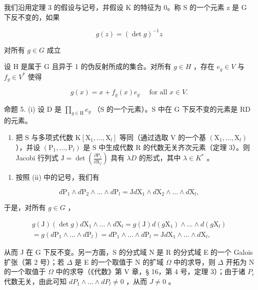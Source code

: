 我们沿用定理 3 的假设与记号，并假设 K 的特征为 0。称 S 的一个元素 z 是 G 下反不变的，如果

\[
g (z) = (\det g) ^ {- 1} z
\]

对所有 \(g\in G\) 成立

设 H 是属于 G 且异于 1 的伪反射所成的集合。对所有 \(g \in H\) ，存在 \(e_{g} \in V\) 与 \(f_{g} \in V^{*}\) 使得

\[
g (x) = x + f _ {g} (x) e _ {g} \quad \text {   for   all   } x \in V.
\]

命题 5. (i) 设 \(\mathrm{D}\) 是 \(\prod_{g \in \mathrm{H}} e_g\) （\(\mathrm{S}\) 的一个元素）。\(\mathrm{S}\) 中在 \(\mathrm{G}\) 下反不变的元素是 \(\mathrm{RD}\) 的元素。

\begin{enumerate}
\def\labelenumi{(\roman{enumi})}
\setcounter{enumi}{1}
\tightlist
\item
  把 S 与多项式代数 \(\mathrm{K}[\mathrm{X}_1,\dots ,\mathrm{X}_l]\) 等同（通过选取 V 的一个基 \((\mathrm{X}_1,\dots ,\mathrm{X}_l)\) ），并设 \((\mathrm{P}_1,\dots ,\mathrm{P}_l)\) 是 S 中生成代数 R 的代数无关齐次元素（定理 3）。则 Jacobi 行列式 \(\mathrm{J} = \det \left(\frac{\partial\mathrm{P}_t}{\partial\mathrm{X}_j}\right)\) 具有 \(\lambda D\) 的形式，其中 \(\lambda \in K^*\) 。
\end{enumerate}

\begin{enumerate}
\def\labelenumi{\alph{enumi})}
\tightlist
\item
  按照 (ii) 中的记号，我们有
\end{enumerate}

\[
d \mathrm{P} _ {1} \wedge d \mathrm{P} _ {2} \wedge \dots \wedge d \mathrm{P} _ {l} = \mathrm{J} d \mathrm{X} _ {1} \wedge d \mathrm{X} _ {2} \wedge \dots \wedge d \mathrm{X} _ {l},
\]

于是，对所有 \(g \in G\) ，

\[
\begin{array}{c} g (\mathrm{J}) (\det g)   d \mathrm{X} _ {1} \wedge \ldots \wedge d \mathrm{X} _ {l} = g (\mathrm{J})   d (g \mathrm{X} _ {1}) \wedge \ldots \wedge d (g \mathrm{X} _ {l}) \\ = g (d \mathrm{P} _ {1} \wedge \ldots \wedge d \mathrm{P} _ {l}) = d \mathrm{P} _ {1} \wedge \ldots \wedge d \mathrm{P} _ {l} = \mathrm{J}   d \mathrm{X} _ {1} \wedge \ldots \wedge d \mathrm{X} _ {l}, \end{array}
\]

从而 J 在 G 下反不变。另一方面，S 的分式域 N 是 R 的分式域 E 的一个 Galois 扩张（第 2 号）；若 \(\Delta\) 是 E 的一个取值于 N 的扩域 \(\Omega\) 中的求导，则 \(\Delta\) 开拓为 N 的一个取值于 \(\Omega\) 中的求导（《代数》第 V 章，§ 16，第 4 号，定理 3）；由于诸 \(P_{i}\) 代数无关，由此可知 \(dP_{1} \wedge \ldots \wedge dP_{l} \neq 0\) ，从而 \(J \neq 0\) 。

